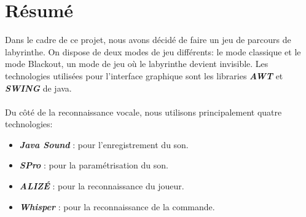\section{Résumé}
\label{sec:resume}

Dans le cadre de ce projet, nous avons décidé de faire un jeu de parcours de labyrinthe. On dispose de deux modes de jeu différents: le mode classique et le mode Blackout,
un mode de jeu où le labyrinthe devient invisible. Les technologies utilisées pour l'interface graphique sont les libraries \textbf{\textit{AWT}} et \textbf{\textit{SWING}} de java. \\\\
Du côté de la reconnaissance vocale, nous utilisons principalement quatre technologies:
\begin{itemize}
    \item \textbf{\textit{Java Sound}} : pour l'enregistrement du son.
    \item \textbf{\textit{SPro}} : pour la paramétrisation du son.
    \item \textbf{\textit{ALIZÉ}} : pour la reconnaissance du joueur.
    \item \textbf{\textit{Whisper}} : pour la reconnaissance de la commande.
\end{itemize}

